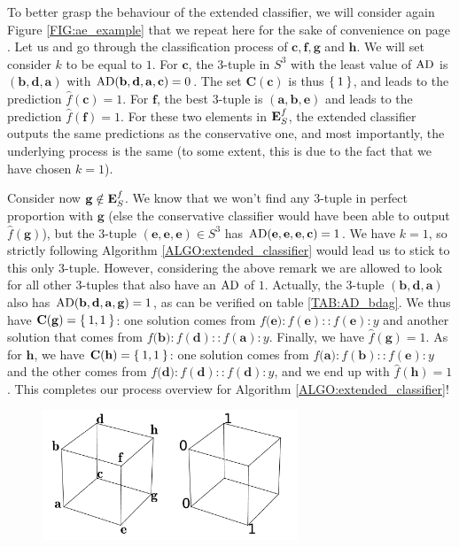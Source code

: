 \begin{testexample}
To better grasp the behaviour of the extended classifier, we will consider
again Figure \ref{FIG:ae_example} that we repeat here for the sake of
  convenience on page \pageref{FIG:ae_example2}. Let us and go
through the classification process of $\mathbf{c}, \mathbf{f}, \mathbf{g}$ and
$\mathbf{h}$. We will set consider $k$ to be equal to $1$. For $\mathbf{c}$,
the $3$-tuple in $S^3$ with the least value of $\text{AD}$ is $(\mathbf{b},
\mathbf{d}, \mathbf{a})$ with $\text{AD}(\mathbf{b},\mathbf{d}, \mathbf{a},
\mathbf{c}) = 0$. The set $\mathbf{C}(\mathbf{c})$ is thus $\Set{1}$, and leads
to the prediction $\hat{f}(\mathbf{c}) = 1$. For $\mathbf{f}$, the best
$3$-tuple is $(\mathbf{a}, \mathbf{b}, \mathbf{e})$ and leads to the prediction
$\hat{f}(\mathbf{f}) = 1$. For these two elements in $\mathbf{E}_{S}^{f}$, the extended
classifier outputs the same predictions as the conservative one, and most
  importantly, the underlying process is the same (to some extent, this
  is due to the fact that we have chosen $k = 1$).

Consider now $\mathbf{g} \notin \mathbf{E}_{S}^{f}$. We know that we won't find any $3$-tuple
in perfect proportion with $\mathbf{g}$ (else the conservative classifier would
have been able to output $\hat{f}(\mathbf{g})$), but the $3$-tuple
$(\mathbf{e}, \mathbf{e}, \mathbf{e}) \in S^3$ has $\text{AD}(\mathbf{e}, \mathbf{e},
\mathbf{e}, \mathbf{c}) = 1$. We have $k = 1$, so strictly following Algorithm
\ref{ALGO:extended_classifier} would lead us to stick to this only $3$-tuple.
However, considering the above remark we are allowed to look for all other
$3$-tuples that also have an $\text{AD}$ of $1$. Actually, the $3$-tuple
$(\mathbf{b}, \mathbf{d}, \mathbf{a})$ also has $\text{AD}(\mathbf{b},\mathbf{d},
\mathbf{a}, \mathbf{g}) = 1$, as can be verified on table \ref{TAB:AD_bdag}. We
thus have $\mathbf{C}(\mathbf{g}) = \Set{1, 1}$: one solution comes from
$f(\mathbf{e)} :f(\mathbf{e}):: f(\mathbf{e}) : y$ and another solution that
comes from $f(\mathbf{b)} :f(\mathbf{d}):: f(\mathbf{a}) : y$.  Finally, we
have $\hat{f}(\mathbf{g}) = 1$. As for $\mathbf{h}$, we have
$\mathbf{C}(\mathbf{h}) = \Set{1, 1}$: one solution comes from $f(\mathbf{a)}
:f(\mathbf{b}):: f(\mathbf{e}) : y$ and the other comes from $f(\mathbf{d)}
:f(\mathbf{d}):: f(\mathbf{d}) : y$, and we end up with $\hat{f}(\mathbf{h}) =
1$. This completes our process overview for Algorithm
\ref{ALGO:extended_classifier}!
\end{testexample}

\begin{figure}[!h]
\centering
  \includegraphics[width=3in]{figures/ae_example.pdf}
  \label{FIG:ae_example2}
\end{figure}

